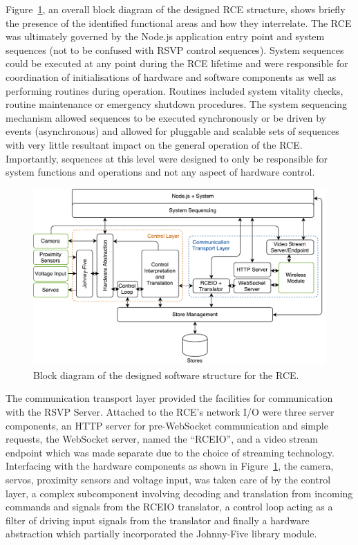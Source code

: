         Figure~\ref{fig:softDesign-rceStructurePlan}, an overall block diagram of the designed RCE structure, shows briefly the presence of the identified functional areas and how they interrelate. The RCE was ultimately governed by the Node.js application entry point and system sequences (not to be confused with RSVP control sequences). System sequences could be executed at any point during the RCE lifetime and were responsible for coordination of initialisations of hardware and software components as well as performing routines during operation. Routines included system vitality checks, routine maintenance or emergency shutdown procedures. The system sequencing mechanism allowed sequences to be executed synchronously or be driven by events (asynchronous) and allowed for pluggable and scalable sets of sequences with very little resultant impact on the general operation of the RCE. Importantly, sequences at this level were designed to only be responsible for system functions and operations and not any aspect of hardware control.
        
        \begin{figure}[h!]
          \centering
          \includegraphics[width=1\linewidth]{figures/softDesign-rceStructurePlan}
          \caption[Block diagram of the designed software structure for the RCE.]{Block diagram of the designed software structure for the RCE.}
          \label{fig:softDesign-rceStructurePlan}
        \end{figure}
        
        The communication transport layer provided the facilities for communication with the RSVP Server. Attached to the RCE's network I/O were three server components, an HTTP server for pre-WebSocket communication and simple requests, the WebSocket server, named the ``RCEIO'', and a video stream endpoint which was made separate due to the choice of streaming technology. Interfacing with the hardware components as shown in Figure~\ref{fig:softDesign-rceStructurePlan}, the camera, servos, proximity sensors and voltage input, was taken care of by the control layer, a complex subcomponent involving decoding and translation from incoming commands and signals from the RCEIO translator, a control loop acting as a filter of driving input signals from the translator and finally a hardware abstraction which partially incorporated the Johnny-Five library module.
        
